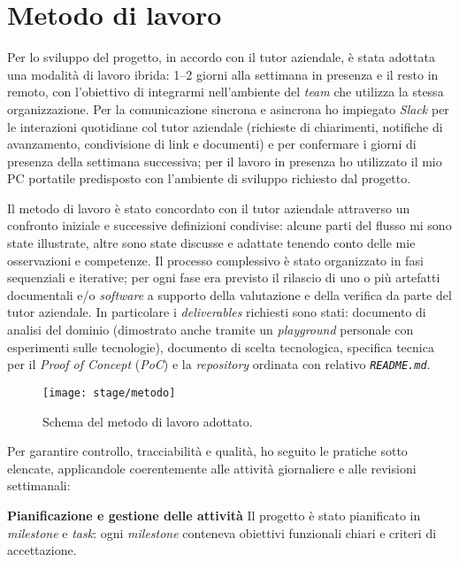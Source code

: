 \section{Metodo di lavoro}

Per lo sviluppo del progetto, in accordo con il tutor aziendale, è stata adottata una modalità di lavoro ibrida: 1–2 giorni alla settimana in presenza e il resto in remoto, 
con l'obiettivo di integrarmi nell'ambiente del \emph{team} che utilizza la stessa organizzazione. Per la comunicazione sincrona e asincrona ho impiegato 
\emph{Slack} per le interazioni quotidiane col tutor aziendale (richieste di chiarimenti, notifiche di avanzamento, condivisione di link e documenti) e per confermare i giorni di presenza 
della settimana successiva; per il lavoro in presenza ho utilizzato il mio PC portatile predisposto con l'ambiente di sviluppo richiesto dal progetto.

Il metodo di lavoro è stato concordato con il tutor aziendale attraverso un confronto iniziale e successive definizioni condivise: alcune parti del 
flusso mi sono state illustrate, altre sono state discusse e adattate tenendo conto delle mie osservazioni e competenze. Il processo complessivo è stato organizzato 
in fasi sequenziali e iterative; per ogni fase era previsto il rilascio di uno o più artefatti documentali e/o \emph{software} a supporto della valutazione e della 
verifica da parte del tutor aziendale. In particolare i \emph{deliverables} richiesti sono stati: documento di analisi del dominio (dimostrato anche tramite un \emph{playground} 
personale con esperimenti sulle tecnologie), documento di scelta tecnologica, specifica tecnica per il \emph{Proof of Concept} (\emph{PoC}) e la \emph{repository} ordinata 
con relativo \texttt{\emph{README.md}}.

\begin{figure}[htbp]
    \centering
    \texttt{[image: stage/metodo]}
    \caption{Schema del metodo di lavoro adottato.}
    \label{fig:metodo}
\end{figure}

Per garantire controllo, tracciabilità e qualità, ho seguito le pratiche sotto elencate, applicandole coerentemente alle attività giornaliere e alle revisioni settimanali:

\medskip
\noindent\textbf{Pianificazione e gestione delle attività}
Il progetto è stato pianificato in \emph{milestone} e \emph{task}: ogni \emph{milestone} conteneva obiettivi funzionali chiari e criteri di accettazione. 


